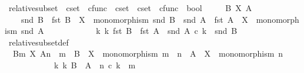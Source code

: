 \begin{isabellebody}
\endisatagproof
{\isafoldproof}%
%
\isadelimproof
\isanewline
%
\endisadelimproof
\isanewline
{}\isamarkupfalse%
\ relative{\isacharunderscore}{\kern0pt}subset\ {\isacharcolon}{\kern0pt}{\isacharcolon}{\kern0pt}\ {\isachardoublequoteopen}cset\ {\isasymtimes}\ cfunc\ {\isasymRightarrow}\ cset\ {\isasymRightarrow}\ cset\ {\isasymtimes}\ cfunc\ {\isasymRightarrow}\ bool{\isachardoublequoteclose}\ {\isacharparenleft}{\kern0pt}{\isachardoublequoteopen}{\isacharunderscore}{\kern0pt}{\isasymsubseteq}\isactrlbsub {\isacharunderscore}{\kern0pt}\isactrlesub {\isacharunderscore}{\kern0pt}{\isachardoublequoteclose}\ {\isacharbrackleft}{\kern0pt}{}{}{\isacharcomma}{\kern0pt}{}{}{\isacharcomma}{\kern0pt}{}{}{\isacharbrackright}{\kern0pt}{}{}{\isacharparenright}{\kern0pt}\isanewline
\ \ \ {\isachardoublequoteopen}B\ {\isasymsubseteq}\isactrlbsub X\isactrlesub \ A\ \ {\isasymlongleftrightarrow}\ \isanewline
\ \ \ \ {\isacharparenleft}{\kern0pt}snd\ B\ {\isacharcolon}{\kern0pt}\ fst\ B\ {\isasymrightarrow}\ X\ {\isasymand}\ monomorphism\ {\isacharparenleft}{\kern0pt}snd\ B{\isacharparenright}{\kern0pt}\ {\isasymand}\ snd\ A\ {\isacharcolon}{\kern0pt}\ fst\ A\ {\isasymrightarrow}\ X\ {\isasymand}\ monomorphism\ {\isacharparenleft}{\kern0pt}snd\ A{\isacharparenright}{\kern0pt}\isanewline
\ \ \ \ \ \ \ \ \ \ {\isasymand}\ {\isacharparenleft}{\kern0pt}{\isasymexists}\ k{\isachardot}{\kern0pt}\ k{\isacharcolon}{\kern0pt}\ fst\ B\ {\isasymrightarrow}\ fst\ A\ {\isasymand}\ snd\ A\ {\isasymcirc}\isactrlsub c\ k\ {\isacharequal}{\kern0pt}\ snd\ B{\isacharparenright}{\kern0pt}{\isacharparenright}{\kern0pt}{\isachardoublequoteclose}\isanewline
\isanewline
{}\isamarkupfalse%
\ relative{\isacharunderscore}{\kern0pt}subset{\isacharunderscore}{\kern0pt}def{}{\isacharcolon}{\kern0pt}\ \isanewline
\ \ {\isachardoublequoteopen}{\isacharparenleft}{\kern0pt}B{\isacharcomma}{\kern0pt}m{\isacharparenright}{\kern0pt}\ {\isasymsubseteq}\isactrlbsub X\isactrlesub \ {\isacharparenleft}{\kern0pt}A{\isacharcomma}{\kern0pt}n{\isacharparenright}{\kern0pt}\ {\isacharequal}{\kern0pt}\ {\isacharparenleft}{\kern0pt}m\ {\isacharcolon}{\kern0pt}\ B\ {\isasymrightarrow}\ X\ {\isasymand}\ monomorphism\ m\ {\isasymand}\ n\ {\isacharcolon}{\kern0pt}\ A\ {\isasymrightarrow}\ X\ {\isasymand}\ monomorphism\ n\isanewline
\ \ \ \ \ \ \ \ \ \ {\isasymand}\ {\isacharparenleft}{\kern0pt}{\isasymexists}\ k{\isachardot}{\kern0pt}\ k{\isacharcolon}{\kern0pt}\ B\ {\isasymrightarrow}\ A\ {\isasymand}\ n\ {\isasymcirc}\isactrlsub c\ k\ {\isacharequal}{\kern0pt}\ m{\isacharparenright}{\kern0pt}{\isacharparenright}{\kern0pt}{\isachardoublequoteclose}\isanewline

\end{isabellebody}
